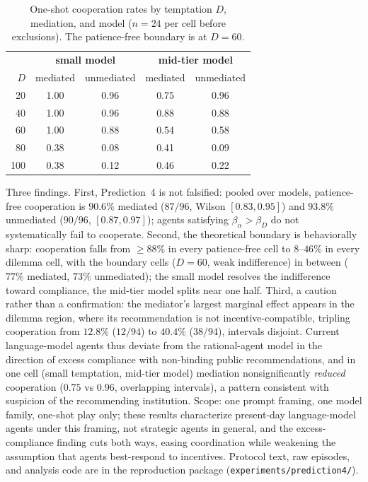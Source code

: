 \documentclass[manuscript,screen,review]{jair}
\begin{document}
\begin{table}[h]
\caption{One-shot cooperation rates by temptation $D$, mediation, and model ($n = 24$ per cell before exclusions). The patience-free boundary is at $D = 60$.}
\label{tab:prediction4}
\centering
\small
\begin{tabular}{rcccc}
\toprule
 & \multicolumn{2}{c}{\textbf{small model}} & \multicolumn{2}{c}{\textbf{mid-tier model}} \\
$D$ & mediated & unmediated & mediated & unmediated \\
\midrule
20  & 1.00 & 0.96 & 0.75 & 0.96 \\
40  & 1.00 & 0.96 & 0.88 & 0.88 \\
60  & 1.00 & 0.88 & 0.54 & 0.58 \\
80  & 0.38 & 0.08 & 0.41 & 0.09 \\
100 & 0.38 & 0.12 & 0.46 & 0.22 \\
\bottomrule
\end{tabular}
\end{table}

Three findings. First, Prediction~4 is not falsified: pooled over models, patience-free cooperation is $90.6\%$ mediated ($87/96$, Wilson $[0.83, 0.95]$) and $93.8\%$ unmediated ($90/96$, $[0.87, 0.97]$); agents satisfying $\beta_\alpha > \beta_D$ do not systematically fail to cooperate. Second, the theoretical boundary is behaviorally sharp: cooperation falls from ${\geq}88\%$ in every patience-free cell to $8$--$46\%$ in every dilemma cell, with the boundary cells ($D = 60$, weak indifference) in between ($77\%$ mediated, $73\%$ unmediated); the small model resolves the indifference toward compliance, the mid-tier model splits near one half. Third, a caution rather than a confirmation: the mediator's largest marginal effect appears in the dilemma region, where its recommendation is not incentive-compatible, tripling cooperation from $12.8\%$ ($12/94$) to $40.4\%$ ($38/94$), intervals disjoint. Current language-model agents thus deviate from the rational-agent model in the direction of excess compliance with non-binding public recommendations, and in one cell (small temptation, mid-tier model) mediation nonsignificantly \emph{reduced} cooperation ($0.75$ vs $0.96$, overlapping intervals), a pattern consistent with suspicion of the recommending institution. Scope: one prompt framing, one model family, one-shot play only; these results characterize present-day language-model agents under this framing, not strategic agents in general, and the excess-compliance finding cuts both ways, easing coordination while weakening the assumption that agents best-respond to incentives. Protocol text, raw episodes, and analysis code are in the reproduction package (\texttt{experiments/prediction4/}).
\end{document}
